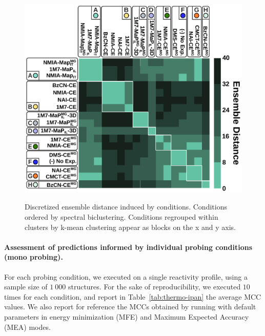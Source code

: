 \documentclass[a4,center,fleqn]{NAR}
\begin{document}
\begin{figure}
	{\centering \includegraphics[width=\linewidth]{graphs/didy/bi_clustering}\\}%
	
	\caption{Discretized ensemble distance induced by conditions. Conditions ordered by spectral biclustering. Conditions regrouped within clusters by k-mean clustering appear as blocks on the x and y axis.}\label{fig:biclustering}
\end{figure}







\paragraph{Assessment of predictions informed by individual probing conditions (mono probing).}



For each probing condition, we executed \OurTool{} on a single reactivity profile, using a sample size of $1~000$ structures. For the sake of reproducibility, we executed \OurTool{} $10$ times for each condition, and report in Table~\ref{tab:thermo-ipan} the average MCC values. We also report for reference the MCCs obtained by running  with default parameters in energy minimization (MFE) and Maximum Expected Accuracy (MEA) modes.
\end{document}
